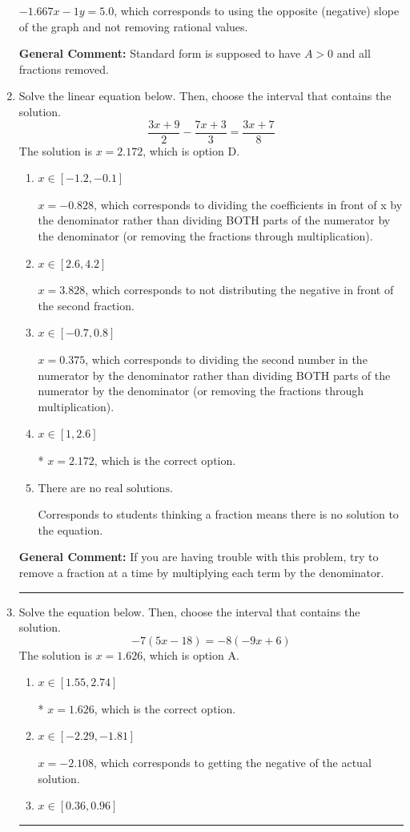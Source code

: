 \documentclass{extbook}[14pt]
\newcommand{\litem}[1]{\item #1

\rule{\textwidth}{0.4pt}}
\begin{document}
\begin{enumerate}
{\begin{enumerate}[label=\Alph*.]
 $-1.667x - 1y = 5.0$, which corresponds to using the opposite (negative) slope of the graph and not removing rational values.
\end{enumerate}

\textbf{General Comment:} Standard form is supposed to have $A > 0$ and all fractions removed.
}
\litem{
Solve the linear equation below. Then, choose the interval that contains the solution.
\[ \frac{3x + 9}{2} - \frac{7x + 3}{3} = \frac{3x + 7}{8} \]
The solution is \( x = 2.172 \), which is option D.\begin{enumerate}[label=\Alph*.]
\item \( x \in [-1.2, -0.1] \)

 $x = -0.828$, which corresponds to dividing the coefficients in front of x by the denominator rather than dividing BOTH parts of the numerator by the denominator (or removing the fractions through multiplication).
\item \( x \in [2.6, 4.2] \)

 $x = 3.828$, which corresponds to not distributing the negative in front of the second fraction.
\item \( x \in [-0.7, 0.8] \)

 $x = 0.375$, which corresponds to dividing the second number in the numerator by the denominator rather than dividing BOTH parts of the numerator by the denominator (or removing the fractions through multiplication).
\item \( x \in [1, 2.6] \)

* $x = 2.172$, which is the correct option.
\item \( \text{There are no real solutions.} \)

Corresponds to students thinking a fraction means there is no solution to the equation.
\end{enumerate}

\textbf{General Comment:} If you are having trouble with this problem, try to remove a fraction at a time by multiplying each term by the denominator.
}
\litem{
Solve the equation below. Then, choose the interval that contains the solution.
\[ -7(5x -18) = -8(-9x + 6) \]
The solution is \( x = 1.626 \), which is option A.\begin{enumerate}[label=\Alph*.]
\item \( x \in [1.55, 2.74] \)

* $x = 1.626$, which is the correct option.
\item \( x \in [-2.29, -1.81] \)

$x = -2.108$, which corresponds to getting the negative of the actual solution.
\item \( x \in [0.36, 0.96] \)


\end{enumerate}}
\end{enumerate}
\end{document}
